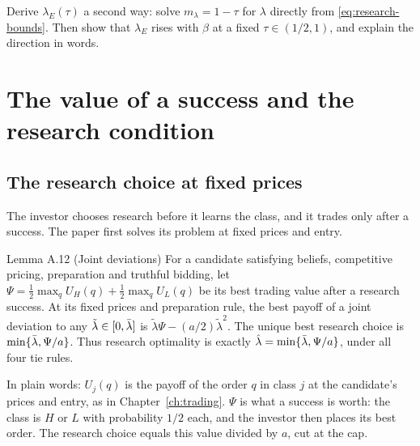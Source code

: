 \begin{checkyourself}\label{q:research-lamE}
Derive \(\lambda_E(\tau)\) a second way: solve \(m_\lambda=1-\tau\) for \(\lambda\) directly from
\eqref{eq:research-bounds}. Then show that \(\lambda_E\) rises with \(\beta\) at a fixed \(\tau\in(1/2,1)\), and explain
the direction in words.
\end{checkyourself}

\section{The value of a success and the research condition}\label{sec:research-value}

\subsection{The research choice at fixed prices}

The investor chooses research before it learns the class, and it trades only after a success. The paper first
solves its problem at fixed prices and entry.

\begin{paperresult}{Lemma A.12 (Joint deviations)}
For a candidate satisfying beliefs, competitive pricing, preparation and truthful bidding, let
\(\Psi=\tfrac12\max_qU_H(q)+\tfrac12\max_qU_L(q)\) be its best trading value after a research success. At its fixed
prices and preparation rule, the best payoff of a joint deviation to any \(\tilde\lambda\in[0,\bar\lambda]\) is
\(\tilde\lambda\Psi-(a/2)\tilde\lambda^2\). The unique best research choice is \(\min\{\bar\lambda,\Psi/a\}\). Thus research
optimality is exactly \(\hat\lambda=\min\{\bar\lambda,\Psi/a\}\), under all four tie rules.
\end{paperresult}

In plain words: \(U_j(q)\) is the payoff of the order \(q\) in class \(j\) at the candidate's prices and entry, as in
Chapter~\ref{ch:trading}. \(\Psi\) is what a success is worth: the class is \(H\) or \(L\) with probability \(1/2\)
each, and the investor then places its best order. The research choice equals this value divided by \(a\), cut at the
cap.

